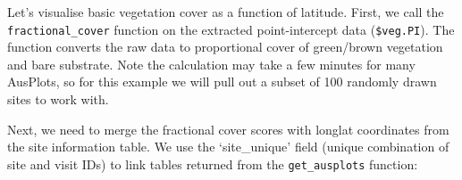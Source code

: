 \documentclass[
]{article}
\newenvironment{Shaded}{\begin{snugshade}}{\end{snugshade}}
\newcommand{\CommentTok}[1]{\textcolor[rgb]{0.56,0.35,0.01}{\textit{#1}}}
\newcommand{\DecValTok}[1]{\textcolor[rgb]{0.00,0.00,0.81}{#1}}
\newcommand{\KeywordTok}[1]{\textcolor[rgb]{0.13,0.29,0.53}{\textbf{#1}}}
\newcommand{\NormalTok}[1]{#1}
\newcommand{\OperatorTok}[1]{\textcolor[rgb]{0.81,0.36,0.00}{\textbf{#1}}}
\newcommand{\StringTok}[1]{\textcolor[rgb]{0.31,0.60,0.02}{#1}}
\begin{document}
Let's visualise basic vegetation cover as a function of latitude. First,
we call the \texttt{fractional\_cover} function on the extracted
point-intercept data (\texttt{\$veg.PI}). The function converts the raw
data to proportional cover of green/brown vegetation and bare substrate.
Note the calculation may take a few minutes for many AusPlots, so for
this example we will pull out a subset of 100 randomly drawn sites to
work with.

\begin{Shaded}
\end{Shaded}

Next, we need to merge the fractional cover scores with longlat
coordinates from the site information table. We use the `site\_unique'
field (unique combination of site and visit IDs) to link tables returned
from the \texttt{get\_ausplots} function:
\end{document}
